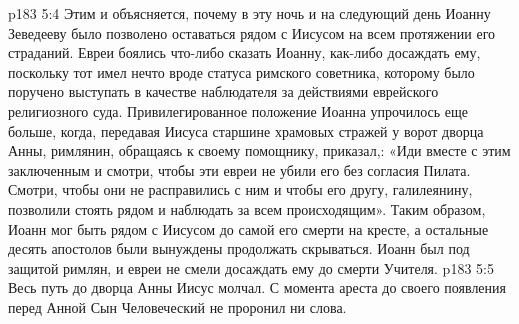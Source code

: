 \vs p183 5:4 Этим и объясняется, почему в эту ночь и на следующий день Иоанну Зеведееву было позволено оставаться рядом с Иисусом на всем протяжении его страданий. Евреи боялись что\hyp{}либо сказать Иоанну, как\hyp{}либо досаждать ему, поскольку тот имел нечто вроде статуса римского советника, которому было поручено выступать в качестве наблюдателя за действиями еврейского религиозного суда. Привилегированное положение Иоанна упрочилось еще больше, когда, передавая Иисуса старшине храмовых стражей у ворот дворца Анны, римлянин, обращаясь к своему помощнику, приказал,: «Иди вместе с этим заключенным и смотри, чтобы эти евреи не убили его без согласия Пилата. Смотри, чтобы они не расправились с ним и чтобы его другу, галилеянину, позволили стоять рядом и наблюдать за всем происходящим». Таким образом, Иоанн мог быть рядом с Иисусом до самой его смерти на кресте, а остальные десять апостолов были вынуждены продолжать скрываться. Иоанн был под защитой римлян, и евреи не смели досаждать ему до смерти Учителя.
\vs p183 5:5 Весь путь до дворца Анны Иисус молчал. С момента ареста до своего появления перед Анной Сын Человеческий не проронил ни слова.
